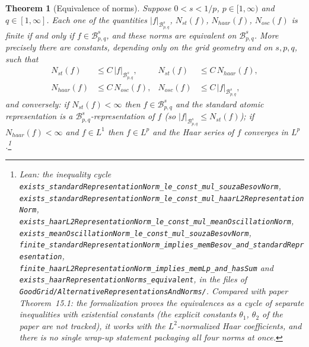 \documentclass[11pt]{amsart}
\newtheorem{theorem}{Theorem}[section]
\theoremstyle{definition}
\newcommand{\lean}[1]{\texttt{#1}}
\begin{document}
\begin{theorem}[Equivalence of norms]\label{alte}
Suppose $0<s<1/p$, $p\in [1,\infty)$ and $q\in [1,\infty]$. Each one of the
quantities $|f|_{\mathcal{B}^s_{p,q}}$, $N_{st}(f)$, $N_{haar}(f)$,
$N_{osc}(f)$ is finite if and only if $f\in \mathcal{B}^s_{p,q}$, and these
norms are equivalent on $\mathcal{B}^s_{p,q}$. More precisely there are
constants, depending only on the grid geometry and on $s,p,q$, such that
\begin{align*}
N_{st}(f) &\leq C\, |f|_{\mathcal{B}^s_{p,q}}, &
N_{st}(f) &\leq C\, N_{haar}(f),\\
N_{haar}(f) &\leq C\, N_{osc}(f), &
N_{osc}(f) &\leq C\, |f|_{\mathcal{B}^s_{p,q}},
\end{align*}
and conversely: if $N_{st}(f)<\infty$ then $f \in \mathcal{B}^s_{p,q}$ and
the standard atomic representation is a
$\mathcal{B}^s_{p,q}$-representation of $f$ (so
$|f|_{\mathcal{B}^s_{p,q}} \leq N_{st}(f)$); if $N_{haar}(f) < \infty$ and
$f \in L^1$ then $f \in L^p$ and the Haar series of $f$ converges in
$L^p$.\footnote{Lean: the inequality cycle
\lean{exists\_standardRepresentationNorm\_le\_const\_mul\_souzaBesovNorm},
\lean{exists\_standardRepresentationNorm\_le\_const\_mul\_haarL2RepresentationNorm},
\lean{exists\_haarL2RepresentationNorm\_le\_const\_mul\_meanOscillationNorm},
\lean{exists\_meanOscillationNorm\_le\_const\_mul\_souzaBesovNorm},
\lean{finite\_standardRepresentationNorm\_implies\_}\allowbreak\lean{memBesov\_and\_standardRepresentation},
\lean{finite\_haarL2RepresentationNorm\_implies\_memLp\_and\_hasSum} and
\lean{exists\_haarRepresentationNorms\_equivalent}, in the files of
\lean{GoodGrid/AlternativeRepresentationsAndNorms/}. Compared with paper
Theorem~15.1: the formalization proves the equivalences as a cycle of
separate inequalities with existential constants (the explicit constants
$\theta_1$, $\theta_2$ of the paper are not tracked), it works with the
$L^2$-normalized Haar coefficients, and there is no single wrap-up statement
packaging all four norms at once.}
\end{theorem}
\end{document}
